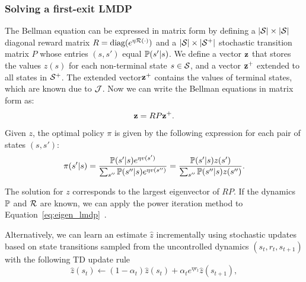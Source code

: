 \subsubsection{Solving a first-exit LMDP}
The Bellman equation can be expressed in matrix form by defining a $\lvert\mathcal{S}\rvert\times\lvert\mathcal{S}\rvert$ diagonal reward matrix $R=\text{diag}(e^{\eta\mathcal{R}(\cdot)})$ and a $\lvert\mathcal{S}\rvert\times \lvert\mathcal{S}^+\rvert$ stochastic transition matrix $P$ whose entries $(s,s')$ equal $\mathbb{P}(s'|s)$. We define a vector $\bf z$ that stores the values $z(s)$ for each non-terminal state $s\in\mathcal{S}$, and a vector $\bf z^+$ extended to all states in $\mathcal{S}^+$. The extended vector$\bf z^+$ contains the values of terminal states, which are known due to $\mathcal{J}$. Now we can write the Bellman equations in matrix form as:
\begin{equation}\label{eq:eigen_lmdp}
{\bf z} = R P {\bf z^+}.
\end{equation}
Given $z$, the optimal policy $\pi$ is given by the following expression for each pair of states $(s,s')$:
\begin{equation}
\label{eq:lmdp_optimal_policy}
\pi(s'|s) =  \frac {\mathbb{P}(s'|s) e^{\eta v(s')} } {\sum_{s''} \mathbb{P}(s''|s) e^{\eta v(s'')} } = \frac {\mathbb{P}(s'|s)z(s')} {\sum_{s''} \mathbb{P}(s''|s)z(s'')}.
\end{equation}

The solution for $z$ corresponds to the largest eigenvector of $RP$.
If the dynamics $\mathbb{P}$ and $\mathcal{R}$ are known, we can apply the power iteration method to Equation~\eqref{eq:eigen_lmdp}~\citep{Todorov2006}.

Alternatively, we can learn an estimate $\widehat{z}$ incrementally using stochastic updates based on state transitions sampled from the uncontrolled dynamics $(s_t,r_t,s_{t+1})$ with the following TD update rule
\begin{equation*}
  \widehat{z}(s_t) \gets (1-\alpha_t)\widehat{z}(s_t) + \alpha_t e^{\eta r_t}\widehat{z}(s_{t+1}),
\end{equation*}

